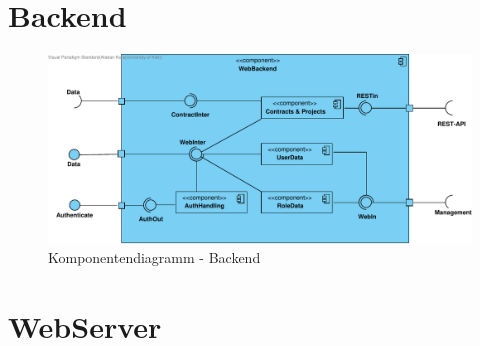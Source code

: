 

\section{Backend}

\begin{figure}[H]
	\centering
	\includegraphics[width=16cm]{img/diagrams/cp_backend.pdf}	
	\caption{Komponentendiagramm - Backend}
	\label{fig:komponentendiagramm-backend}
\end{figure}

\section{WebServer}

